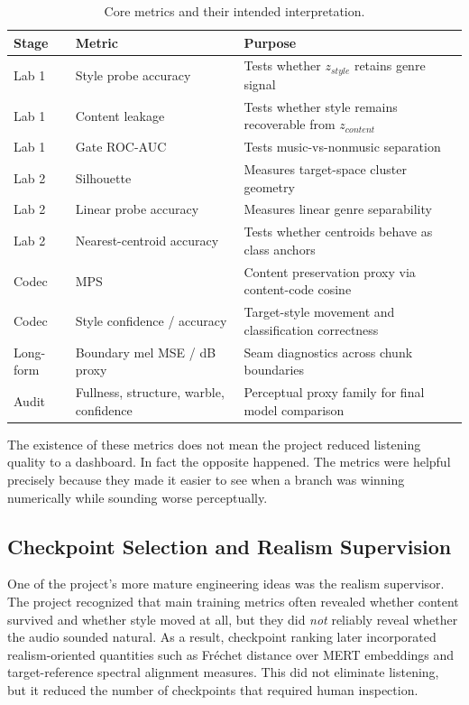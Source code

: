 \documentclass[conference]{IEEEtran}
\begin{document}
\begin{table}[t]
\caption{Core metrics and their intended interpretation.}
\label{tab:metricdefs}
\centering
\small
\begin{tabular}{@{}p{1.8cm}p{2.0cm}p{2.6cm}@{}}
\toprule
\textbf{Stage} & \textbf{Metric} & \textbf{Purpose} \\
\midrule
Lab 1 & Style probe accuracy & Tests whether $z_{style}$ retains genre signal \\
Lab 1 & Content leakage & Tests whether style remains recoverable from $z_{content}$ \\
Lab 1 & Gate ROC-AUC & Tests music-vs-nonmusic separation \\
Lab 2 & Silhouette & Measures target-space cluster geometry \\
Lab 2 & Linear probe accuracy & Measures linear genre separability \\
Lab 2 & Nearest-centroid accuracy & Tests whether centroids behave as class anchors \\
Codec & MPS & Content preservation proxy via content-code cosine \\
Codec & Style confidence / accuracy & Target-style movement and classification correctness \\
Long-form & Boundary mel MSE / dB proxy & Seam diagnostics across chunk boundaries \\
Audit & Fullness, structure, warble, confidence & Perceptual proxy family for final model comparison \\
\bottomrule
\end{tabular}
\end{table}

The existence of these metrics does not mean the project reduced listening quality to a dashboard. In fact the opposite happened. The metrics were helpful precisely because they made it easier to see when a branch was winning numerically while sounding worse perceptually.

\subsection{Checkpoint Selection and Realism Supervision}
One of the project's more mature engineering ideas was the realism supervisor. The project recognized that main training metrics often revealed whether content survived and whether style moved at all, but they did \emph{not} reliably reveal whether the audio sounded natural. As a result, checkpoint ranking later incorporated realism-oriented quantities such as Fr\'echet distance over MERT embeddings and target-reference spectral alignment measures. This did not eliminate listening, but it reduced the number of checkpoints that required human inspection.
\end{document}
